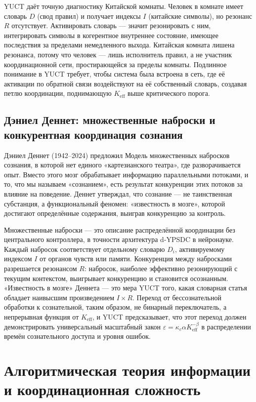 \documentclass[12pt,a4paper]{article}
\begin{document}
	YUCT даёт точную диагностику Китайской комнаты. Человек в комнате имеет словарь \(D\) (свод правил) и получает индексы \(I\) (китайские символы), но резонанс \(R\) отсутствует. Активировать словарь — значит резонировать с ним, интегрировать символы в когерентное внутреннее состояние, имеющее последствия за пределами немедленного выхода. Китайская комната лишена резонанса, потому что человек — лишь исполнитель правил, а не участник координационной сети, простирающейся за пределы комнаты. Подлинное понимание в YUCT требует, чтобы система была встроена в сеть, где её активации по обратной связи воздействуют на её собственный словарь, создавая петлю координации, поднимающую \(K_{\mathrm{eff}}\) выше критического порога.
	
	\subsection{Дэниел Деннет: множественные наброски и конкурентная координация сознания}
	
	Дэниел Деннет (1942–2024) предложил Модель множественных набросков сознания, в которой нет единого «картезианского театра», где разворачивается опыт. Вместо этого мозг обрабатывает информацию параллельными потоками, и то, что мы называем «сознанием», есть результат конкуренции этих потоков за влияние на поведение. Деннет утверждал, что сознание — не таинственная субстанция, а функциональный феномен: «известность в мозге», которой достигают определённые содержания, выиграв конкуренцию за контроль.
	
	Множественные наброски — это описание распределённой координации без центрального контроллера, в точности архитектура d‑YPSDC в нейронауке. Каждый набросок соответствует отдельному словарю \(D_i\), активируемому индексом \(I\) от органов чувств или памяти. Конкуренция между набросками разрешается резонансом \(R\): набросок, наиболее эффективно резонирующий с текущим контекстом, выигрывает конкуренцию и становится осознанным. «Известность в мозге» Деннета — это мера YUCT того, какая словарная статья обладает наивысшим произведением \(I \times R\). Переход от бессознательной обработки к сознательной, таким образом, не бинарный переключатель, а непрерывная функция от \(K_{\mathrm{eff}}\), и YUCT предсказывает, что этот переход должен демонстрировать универсальный масштабный закон \(\varepsilon = \kappa_c \alpha K_{\mathrm{eff}}^{-\beta}\) в распределении времён сознательного доступа и уровня ошибок.
	
	\section{Алгоритмическая теория информации и координационная сложность}
	
\end{document}
